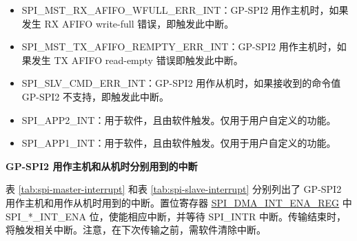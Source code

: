 \documentclass[main\_\_CN.tex]{subfiles}
\begin{document}
\begin{itemize}
\item \label{int:SPIMSTRXAFIFOWFULLERRINT}
SPI\_MST\_RX\_AFIFO\_WFULL\_ERR\_INT：GP-SPI2 用作主机时，如果发生 RX AFIFO write-full 错误，即触发此中断。

\item \label{int:SPIMSTTXAFIFOREMPTYERRINT}
SPI\_MST\_TX\_AFIFO\_REMPTY\_ERR\_INT：GP-SPI2 用作主机时，如果发生 TX AFIFO read-empty 错误即触发此中断。

\item \label{int:SPISLVCMDERRINT} SPI\_SLV\_CMD\_ERR\_INT：GP-SPI2 用作从机时，如果接收到的命令值 GP-SPI2 不支持，即触发此中断。

\item \label{int:SPIAPP2INT}SPI\_APP2\_INT：用于软件，且由软件触发。仅用于用户自定义的功能。
\item \label{int:SPIAPP1INT}SPI\_APP1\_INT：用于软件，且由软件触发。仅用于用户自定义的功能。

\end{itemize}

\textbf{GP-SPI2 用作主机和从机时分别用到的中断}

表  \ref{tab:spi-master-interrupt} 和表 \ref{tab:spi-slave-interrupt} 分别列出了 GP-SPI2 用作主机和用作从机时用到的中断。置位寄存器 \hyperref[regdesc:SPIDMAINTENAREG]{SPI\_DMA\_INT\_ENA\_REG} 中SPI\_*\_INT\_ENA 位，使能相应中断，并等待 SPI\_INTR 中断。传输结束时，将触发相关中断。注意，在下次传输之前，需软件清除中断。
\end{document}

